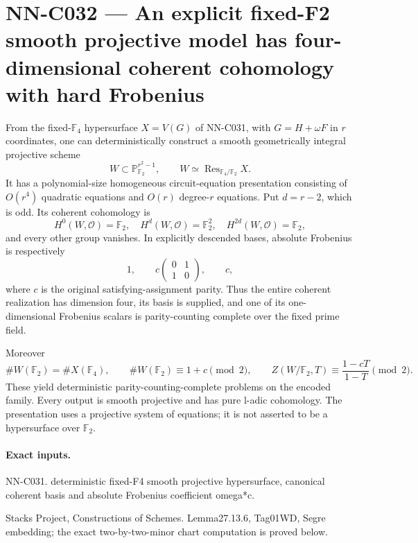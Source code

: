 \section{NN-C032 --- An explicit fixed-F2 smooth projective model has four-dimensional coherent cohomology with hard Frobenius}
\begin{proposition}[NN-C032]
From the fixed-$\mathbb F_4$ hypersurface $X=V(G)$ of NN-C031, with $G=H+\omega F$ in $r$ coordinates, one can deterministically construct a smooth geometrically integral projective scheme
\[
             W\subset\mathbb P^{r^2-1}_{\mathbb F_2},
              \qquad W\simeq\operatorname{Res}_{\mathbb F_4/\mathbb F_2}X.
\]
It has a polynomial-size homogeneous circuit-equation presentation consisting of $O(r^4)$ quadratic equations and $O(r)$ degree-$r$ equations. Put $d=r-2$, which is odd. Its coherent cohomology is
\[
 H^0(W,\mathcal O)=\mathbb F_2,\quad
 H^d(W,\mathcal O)=\mathbb F_2^2,\quad
 H^{2d}(W,\mathcal O)=\mathbb F_2,
\]
and every other group vanishes. In explicitly descended bases, absolute Frobenius is respectively
\[
                   1,\qquad
              c\begin{pmatrix}0&1\\1&0\end{pmatrix},
                   \qquad c,
\]
where $c$ is the original satisfying-assignment parity. Thus the entire coherent realization has dimension four, its basis is supplied, and one of its one-dimensional Frobenius scalars is parity-counting complete over the fixed prime field.

Moreover
\[
 \#W(\mathbb F_2)=\#X(\mathbb F_4),\qquad
 \#W(\mathbb F_2)\equiv1+c\pmod2,\qquad
 Z(W/\mathbb F_2,T)\equiv\frac{1-cT}{1-T}\pmod2.
\]
These yield deterministic parity-counting-complete problems on the encoded family. Every output is smooth projective and has pure l-adic cohomology. The presentation uses a projective system of equations; it is not asserted to be a hypersurface over $\mathbb F_2$.
\end{proposition}
\paragraph{Exact inputs.}
NN-C031. deterministic fixed-F4 smooth projective hypersurface, canonical coherent basis and absolute Frobenius coefficient omega*c.

Stacks Project, Constructions of Schemes. Lemma27.13.6, Tag01WD, Segre embedding; the exact two-by-two-minor chart computation is proved below.

